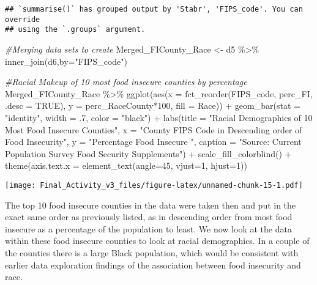 \documentclass[
]{article}
\newenvironment{Shaded}{\begin{snugshade}}{\end{snugshade}}
\newcommand{\AttributeTok}[1]{\textcolor[rgb]{0.77,0.63,0.00}{#1}}
\newcommand{\CommentTok}[1]{\textcolor[rgb]{0.56,0.35,0.01}{\textit{#1}}}
\newcommand{\ConstantTok}[1]{\textcolor[rgb]{0.00,0.00,0.00}{#1}}
\newcommand{\DecValTok}[1]{\textcolor[rgb]{0.00,0.00,0.81}{#1}}
\newcommand{\FunctionTok}[1]{\textcolor[rgb]{0.00,0.00,0.00}{#1}}
\newcommand{\NormalTok}[1]{#1}
\newcommand{\OtherTok}[1]{\textcolor[rgb]{0.56,0.35,0.01}{#1}}
\newcommand{\SpecialCharTok}[1]{\textcolor[rgb]{0.00,0.00,0.00}{#1}}
\newcommand{\StringTok}[1]{\textcolor[rgb]{0.31,0.60,0.02}{#1}}
\begin{document}
\begin{verbatim}
## `summarise()` has grouped output by 'Stabr', 'FIPS_code'. You can override
## using the `.groups` argument.
\end{verbatim}

\begin{Shaded}
\begin{Highlighting}[]
\CommentTok{\#Merging data sets to create}
\NormalTok{Merged\_FICounty\_Race }\OtherTok{\textless{}{-}}\NormalTok{ d5 }\SpecialCharTok{\%\textgreater{}\%} \FunctionTok{inner\_join}\NormalTok{(d6,}\AttributeTok{by=}\StringTok{"FIPS\_code"}\NormalTok{)}


\CommentTok{\#Racial Makeup of 10 most food insecure counties by percentage}
\NormalTok{Merged\_FICounty\_Race }\SpecialCharTok{\%\textgreater{}\%}
  \FunctionTok{ggplot}\NormalTok{(}\FunctionTok{aes}\NormalTok{(}\AttributeTok{x =} \FunctionTok{fct\_reorder}\NormalTok{(FIPS\_code, perc\_FI, }\AttributeTok{.desc =} \ConstantTok{TRUE}\NormalTok{), }\AttributeTok{y =}\NormalTok{ perc\_RaceCounty}\SpecialCharTok{*}\DecValTok{100}\NormalTok{, }\AttributeTok{fill =}\NormalTok{ Race)) }\SpecialCharTok{+}
  \FunctionTok{geom\_bar}\NormalTok{(}\AttributeTok{stat =} \StringTok{"identity"}\NormalTok{, }\AttributeTok{width =}\NormalTok{ .}\DecValTok{7}\NormalTok{, }\AttributeTok{color =} \StringTok{"black"}\NormalTok{) }\SpecialCharTok{+}
  \FunctionTok{labs}\NormalTok{(}\AttributeTok{title =} \StringTok{"Racial Demographics of 10 Most Food Insecure Counties"}\NormalTok{,}
       \AttributeTok{x =} \StringTok{"County FIPS Code in Descending order of Food Insecurity"}\NormalTok{,}
       \AttributeTok{y =} \StringTok{"Percentage Food Insecure "}\NormalTok{,}
       \AttributeTok{caption =} \StringTok{"Source: Current Population Survey Food Security Supplements"}\NormalTok{) }\SpecialCharTok{+}
  \FunctionTok{scale\_fill\_colorblind}\NormalTok{() }\SpecialCharTok{+}
  \FunctionTok{theme}\NormalTok{(}\AttributeTok{axis.text.x =} \FunctionTok{element\_text}\NormalTok{(}\AttributeTok{angle=}\DecValTok{45}\NormalTok{, }\AttributeTok{vjust=}\DecValTok{1}\NormalTok{, }\AttributeTok{hjust=}\DecValTok{1}\NormalTok{)) }
\end{Highlighting}
\end{Shaded}

\texttt{[image: Final\_Activity\_v3\_files/figure-latex/unnamed-chunk-15-1.pdf]}

The top 10 food insecure counties in the data were taken then and put in
the exact same order as previously listed, as in descending order from
most food insecure as a percentage of the population to least. We now
look at the data within these food insecure counties to look at racial
demographics. In a couple of the counties there is a large Black
population, which would be consistent with earlier data exploration
findings of the association between food insecurity and race.
\end{document}
